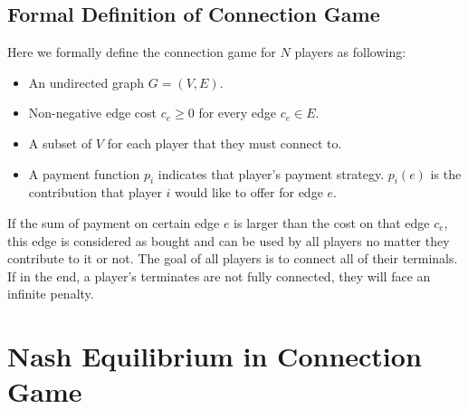 \documentclass[11pt,psfig,times]{article}
\begin{document}
\subsection{Formal Definition of Connection Game}
Here we formally define the connection game for \(N\) players as following:
\begin{itemize}
	\item An undirected graph \(G = (V,E)\).
	\item Non-negative edge cost \(c_e \geq 0\) for every edge $c_e \in E$.
	\item A subset of \(V\) for each player that they must connect to. 
	\item A payment function \(p_i\) indicates that player's payment strategy. \(p_i(e)\) is the contribution that player \(i\) would like to offer for edge \(e\).
\end{itemize}

If the sum of payment on certain edge \(e\) is larger than the cost on that edge \(c_e\), this edge is considered as bought and can be used by all players no matter they contribute to it or not. The goal of all players is to connect all of their terminals. If in the end, a player's terminates are not fully connected, they will face an infinite penalty.  

\section{Nash Equilibrium in Connection Game}
\end{document}
